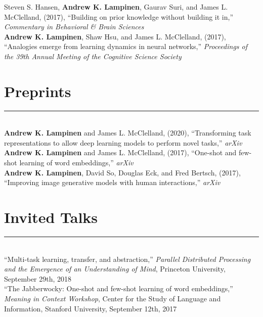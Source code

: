 \documentclass[margin]{res}
\begin{document}
\begin{resume}
Steven S. Hansen, \textbf{Andrew K. Lampinen}, Gaurav Suri, and James L. McClelland, (2017), {``Building on prior knowledge without building it in,''} \textit{Commentary in Behavioral \& Brain Sciences}  \\[3pt]
\textbf{Andrew K. Lampinen}, Shaw Hsu, and James L. McClelland, (2017), {``Analogies emerge from learning dynamics in neural networks,''} \textit{Proceedings of the 39th Annual Meeting of the Cognitive Science Society}  

\vspace{1pt}\section{Preprints} \vspace{-15pt} \rule{\textwidth}{0.5pt} \\[3pt]
\textbf{Andrew K. Lampinen} and James L. McClelland, (2020), {``Transforming task representations to allow deep learning models to perform novel tasks,''} \textit{arXiv} \\[3pt] 
\textbf{Andrew K. Lampinen} and James L. McClelland, (2017), {``One-shot and few-shot learning of word embeddings,''} \textit{arXiv} \\[3pt] 
\textbf{Andrew K. Lampinen}, David So, Douglas Eck, and Fred Bertsch, (2017), {``Improving image generative models with human interactions,''} \textit{arXiv} 

\vspace{1pt}\section{Invited Talks} \vspace{-15pt} \rule{\textwidth}{0.5pt} \\[3pt]
{``Multi-task learning, transfer, and abstraction,''} \textit{Parallel Distributed Processing and the Emergence of an Understanding of Mind}, Princeton University, September 29th, 2018\\[3pt] 
{``The Jabberwocky: One-shot and few-shot learning of word embeddings,''} \textit{Meaning in Context Workshop}, Center for the Study of Language and Information,  Stanford University, September 12th, 2017 
 

\end{resume}
\end{document}
